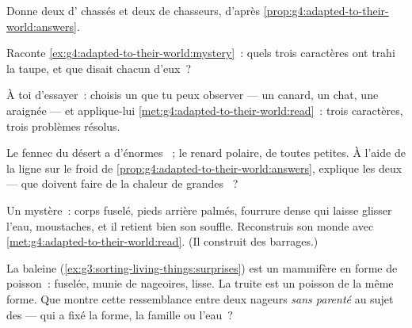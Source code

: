 \begin{exercise}[$\star$]\label{exo:g4:adapted-to-their-world:6}
Donne deux  d' chassés et deux de chasseurs,
d'après \cref{prop:g4:adapted-to-their-world:answers}.
\end{exercise}

\begin{exercise}[$\star$]\label{exo:g4:adapted-to-their-world:7}
Raconte \cref{ex:g4:adapted-to-their-world:mystery}~: quels trois
caractères ont trahi la taupe, et que disait chacun d'eux~?
\end{exercise}

\begin{exercise}[$\star$]\label{exo:g4:adapted-to-their-world:8}
À toi d'essayer~: choisis un  que tu peux observer --- un
canard, un chat, une araignée --- et applique-lui
\cref{met:g4:adapted-to-their-world:read}~: trois caractères, trois
problèmes résolus.
\end{exercise}

\begin{exercise}[$\star\star$]\label{exo:g4:adapted-to-their-world:9}
Le fennec du désert a d'énormes ~; le renard polaire, de
toutes petites. À l'aide de la ligne sur le froid de
\cref{prop:g4:adapted-to-their-world:answers}, explique les deux ---
que doivent faire de la chaleur de grandes ~?
\end{exercise}

\begin{exercise}[$\star\star$]\label{exo:g4:adapted-to-their-world:10}
Un  mystère~: corps fuselé, pieds arrière palmés, fourrure
dense qui laisse glisser l'eau, moustaches, et il retient bien son
souffle. Reconstruis son monde avec
\cref{met:g4:adapted-to-their-world:read}. (Il construit des
barrages.)
\end{exercise}

\begin{exercise}[$\star\star\star$]\label{exo:g4:adapted-to-their-world:11}
La baleine (\cref{ex:g3:sorting-living-things:surprises}) est un
mammifère en forme de poisson~: fuselée, munie de nageoires, lisse.
La truite est un poisson de la même forme. Que montre cette
ressemblance entre deux nageurs \emph{sans parenté} au sujet des
 --- qui a fixé la forme, la famille ou l'eau~?
\end{exercise}
